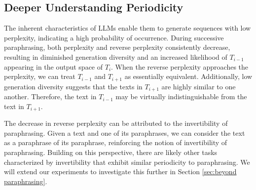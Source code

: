 \subsection{Deeper Understanding Periodicity}
\label{sec:Convergence2Periodicity}

The inherent characteristics of LLMs enable them to generate sequences with low perplexity, indicating a high probability of occurrence. 
During successive paraphrasing, both perplexity and reverse perplexity consistently decrease, resulting in diminished generation diversity and an increased likelihood of \(T_{i-1}\) appearing in the output space of \(T_i\). 
When the reverse perplexity approaches the perplexity, we can treat \(T_{i-1}\) and \(T_{i+1}\) as essentially equivalent. Additionally, low generation diversity suggests that the texts in \(T_{i+1}\) are highly similar to one another.
Therefore, the text in \(T_{i-1}\) may be virtually indistinguishable from the text in \(T_{i+1}\).





The decrease in reverse perplexity can be attributed to the invertibility of paraphrasing. 
Given a text and one of its paraphrases, we can consider the text as a paraphrase of its paraphrase, reinforcing the notion of invertibility of paraphrasing.
Building on this perspective, there are likely other tasks characterized by invertibility that exhibit similar periodicity to paraphrasing. We will extend our experiments to investigate this further in Section \ref{sec:beyond paraphrasing}.





